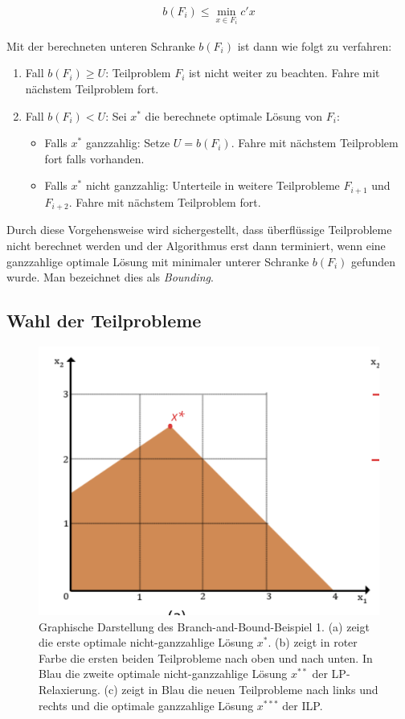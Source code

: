 \documentclass[tog]{acmsiggraph}
\begin{document}
\large
\begin{align}
\label{Eq:Bounding-Untere-Schranke}
b(F_i) \leq \min_{x \in F_i} c'x
\end{align}
\normalsize

Mit der berechneten unteren Schranke $b(F_i)$ ist dann wie folgt zu verfahren:
\begin{enumerate}
\item Fall $b(F_i) \geq U$: Teilproblem $F_i$ ist nicht weiter zu beachten. Fahre mit nächstem Teilproblem fort.
\item Fall $b(F_i) < U$: Sei $x^*$ die berechnete optimale Lösung von $F_i$:

\begin{itemize}
\item Falls $x^*$ ganzzahlig: Setze $U = b(F_i)$. Fahre mit nächstem Teilproblem fort falls vorhanden.
\item Falls $x^*$ nicht ganzzahlig: Unterteile in weitere Teilprobleme $F_{i+1}$ und $F_{i+2}$. Fahre mit nächstem Teilproblem fort.
\end{itemize}
\end{enumerate}

Durch diese Vorgehensweise wird sichergestellt, dass überflüssige Teilprobleme nicht berechnet werden und der Algorithmus erst dann terminiert, wenn eine ganzzahlige optimale Lösung mit minimaler unterer Schranke $b(F_i)$ gefunden wurde. Man bezeichnet dies als \textit{Bounding}.

\subsection*{Wahl der Teilprobleme}

\begin{figure}[t!]
  \centering
  \includegraphics[scale=0.40]{images/bab-example}
  \caption{Graphische Darstellung des Branch-and-Bound-Beispiel 1. (a) zeigt die erste optimale nicht-ganzzahlige Lösung $x^{*}$. (b) zeigt in roter Farbe die ersten beiden Teilprobleme nach oben und nach unten. In Blau die zweite optimale nicht-ganzzahlige Lösung $x^{**}$ der LP-Relaxierung. (c) zeigt in Blau die neuen Teilprobleme nach links und rechts und die optimale ganzzahlige Lösung $x^{***}$ der ILP. }
  \label{fig:bab-example1}
\end{figure}
\end{document}
